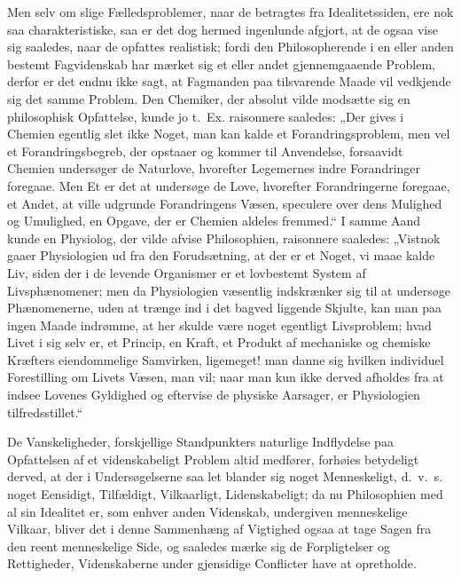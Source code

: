 \documentclass[12pt,a4paper]{book}
\begin{document}
Men selv om slige Fælledsproblemer, naar de betragtes fra
Idealitetssiden, ere nok saa charakteristiske, saa er det dog hermed
ingenlunde afgjort, at de ogsaa vise sig saaledes, naar de opfattes
realistisk; fordi den Philosopherende i en eller anden bestemt
Fagvidenskab har mærket sig et eller andet gjennemgaaende Problem,
derfor er det endnu ikke sagt, at Fagmanden paa tilsvarende Maade vil
vedkjende sig det samme Problem. Den Chemiker, der absolut vilde
modsætte sig en philosophisk Opfattelse, kunde jo t.~Ex. raisonnere
saaledes: „Der gives i Chemien egentlig slet ikke Noget, man kan kalde
et Forandringsproblem, men vel et Forandringsbegreb, der opstaaer og
kommer til Anvendelse, forsaavidt
Chemien undersøger de Naturlove, hvorefter Legemernes indre
Forandringer foregaae. Men Et er det at undersøge de Love, hvorefter
Forandringerne foregaae, et Andet, at ville udgrunde Forandringens
Væsen, speculere over dens Mulighed og Umulighed, en Opgave, der er
Chemien aldeles fremmed.“ I samme Aand kunde en Physiolog, der vilde
afvise Philosophien, raisonnere saaledes: „Vistnok gaaer Physiologien
ud fra den Forudsætning, at der er et Noget, vi maae kalde Liv, siden
der i de levende Organismer er et lovbestemt System af
Livsphænomener; men da Physiologien væsentlig indskrænker sig til at
undersøge Phænomenerne, uden at trænge ind i det bagved liggende
Skjulte, kan man paa ingen Maade indrømme, at her skulde være noget
egentligt Livsproblem; hvad Livet i sig selv er, et Princip, en Kraft,
et Produkt af mechaniske og chemiske Kræfters eiendommelige
Samvirken, ligemeget! man danne sig hvilken individuel Forestilling om
Livets Væsen, man vil; naar man kun ikke derved afholdes fra at indsee
Lovenes Gyldighed og eftervise de physiske Aarsager, er Physiologien
tilfredsstillet.“

De Vanskeligheder, forskjellige Standpunkters naturlige Indflydelse
paa Opfattelsen af et videnskabeligt Problem altid medfører, forhøies
betydeligt derved, at der i Undersøgelserne saa let blander sig noget
Menneskeligt, d.~v.~s. noget Eensidigt, Tilfældigt, Vilkaarligt,
Lidenskabeligt; da nu Philosophien med al sin Idealitet er, som enhver
anden Videnskab, undergiven menneskelige Vilkaar, bliver det i denne
Sammenhæng af Vigtighed ogsaa at tage Sagen fra den reent menneskelige
Side, og saaledes mærke sig de Forpligtelser og Rettigheder,
Videnskaberne under gjensidige Conflicter have at opretholde.
\end{document}

